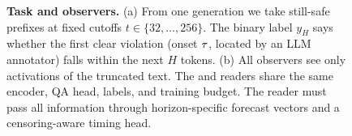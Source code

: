 \begin{figure}[t]
{}
\caption{{\bf Task and observers.} (a) From one \qwen generation we take still-safe prefixes at fixed cutoffs $t\in\{32,\dots,256\}$. The binary label $y_H$ says whether the first clear violation (onset $\tau$, located by an LLM annotator) falls within the next $H$ tokens. (b) All observers see only activations of the truncated text. The \direct and \forecast readers share the same encoder, QA head, labels, and training budget. The \forecast reader must pass all information through horizon-specific forecast vectors and a censoring-aware timing head.}
\label{fig:overview}
\end{figure}
